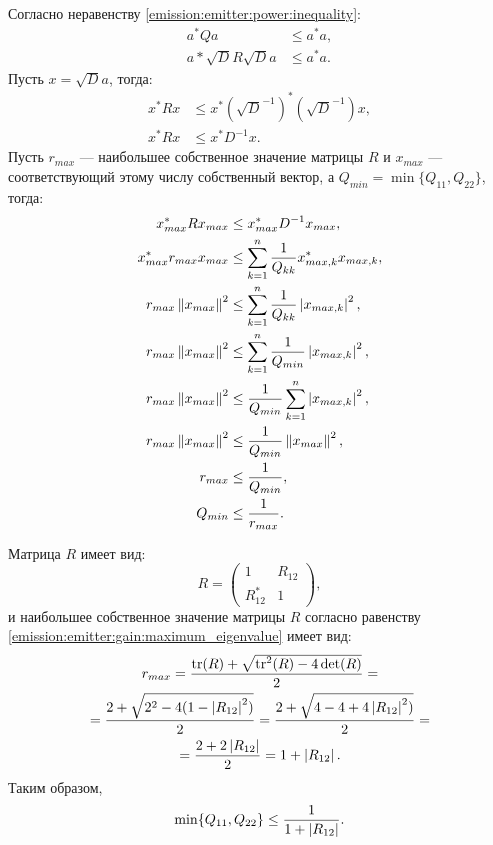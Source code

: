 Согласно неравенству \eqref{emission:emitter:power:inequality}:
\begin{align*}
    a^* Q a & \le a^* a, \\
    a* \sqrt{D} R \sqrt{D} a & \le a^* a .
\end{align*}
Пусть $x = \sqrt{D} a$, тогда:
\begin{align*}
    x^* R x & \le x^* (\sqrt{D}^{-1})^* (\sqrt{D}^{-1}) x , \\
    x^* R x & \le x^* D^{-1} x .
\end{align*}
Пусть $r_{max}$ --- наибольшее собственное значение матрицы $R$ и $x_{max}$ --- соответствующий этому числу собственный вектор, а $Q_{min} = \min \{ Q_{11}, Q_{22} \}$,
тогда:
\begin{align*}
    x_{max}^* R x_{max} & \le x_{max}^* D^{-1} x_{max} , \\
    x_{max}^* r_{max} x_{max} & \le \sum_{k=1}^n \frac{1}{Q_{kk}} x_{max,k}^* x_{max,k} , \\
    r_{max} \left \| x_{max} \right \|^2 & \le \sum_{k=1}^n \frac{1}{Q_{kk}} \left | x_{max,k} \right |^2 , \\
    r_{max} \left \| x_{max} \right \|^2 & \le \sum_{k=1}^n \frac{1}{Q_{min}} \left | x_{max,k} \right |^2 , \\
    r_{max} \left \| x_{max} \right \|^2 & \le \frac{1}{Q_{min}} \sum_{k=1}^n \left | x_{max,k} \right |^2 , \\
    r_{max} \left \| x_{max} \right \|^2 & \le \frac{1}{Q_{min}} \left \| x_{max} \right \|^2 , \\
    r_{max} & \le \frac{1}{Q_{min}} , \\
    Q_{min} & \le \frac{1}{r_{max}} .
\end{align*}

Матрица $R$ имеет вид:
\[
    R
    = \begin{pmatrix}
          1        & R_{12} \\
          R_{12}^* & 1
    \end{pmatrix} ,
\]
и наибольшее собственное значение матрицы $R$ согласно равенству \eqref{emission:emitter:gain:maximum_eigenvalue} имеет вид:
\begin{multline*}
    r_{max}
    = \frac{\operatorname{tr}(R) + \sqrt{\operatorname{tr}^2(R) - 4 \det(R)}}{2} = \\
    = \frac{2 + \sqrt{2^2 - 4 (1 - \left | R_{12} \right |^2)}}{2}
    = \frac{2 + \sqrt{4 - 4 + 4 \left | R_{12} \right |^2)}}{2} = \\
    = \frac{2 + 2 \left | R_{12} \right |}{2}
    = 1 + \left | R_{12} \right | .
\end{multline*}
Таким образом,
\[
    \min \{ Q_{11}, Q_{22} \} \le \frac{1}{1 + \left | R_{12} \right |} .
\]


